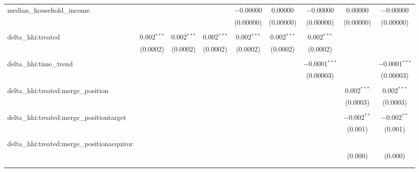 \begin{table}[H]
{\begin{tabular}{@{\extracolsep{5pt}}lcccccccc}
  median\_household\_income &  &  &  & $-$0.00000 & 0.00000 & $-$0.00000 & 0.00000 & $-$0.00000 \\  

   &  &  &  & (0.00000) & (0.00000) & (0.00000) & (0.00000) & (0.00000) \\  

   & & & & & & & & \\  

  delta\_hhi:treated & 0.002$^{***}$ & 0.002$^{***}$ & 0.002$^{***}$ & 0.002$^{***}$ & 0.002$^{***}$ & 0.002$^{***}$ &  &  \\  

   & (0.0002) & (0.0002) & (0.0002) & (0.0002) & (0.0002) & (0.0002) &  &  \\  

   & & & & & & & & \\  

  delta\_hhi:time\_trend &  &  &  &  &  & $-$0.0001$^{***}$ &  & $-$0.0001$^{***}$ \\  

   &  &  &  &  &  & (0.00003) &  & (0.00003) \\  

   & & & & & & & & \\  

  delta\_hhi:treated:merge\_position &  &  &  &  &  &  & 0.002$^{***}$ & 0.002$^{***}$ \\  

   &  &  &  &  &  &  & (0.0003) & (0.0003) \\  

   & & & & & & & & \\  

  delta\_hhi:treated:merge\_positiontarget &  &  &  &  &  &  & $-$0.002$^{**}$ & $-$0.002$^{**}$ \\  

   &  &  &  &  &  &  & (0.001) & (0.001) \\  

   & & & & & & & & \\  

  delta\_hhi:treated:merge\_positionacquiror &  &  &  &  &  &  &  &  \\  

   &  &  &  &  &  &  & (0.000) & (0.000) \\  

   & & & & & & & & \\  

 \hline \\[-1.8ex]  


\end{tabular}}
\end{table}
